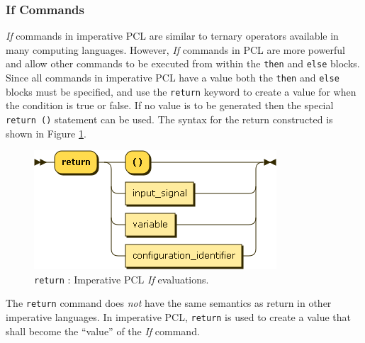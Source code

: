 \subsubsection{If Commands}
\emph{If} commands in imperative PCL are similar to ternary operators available in many computing languages. However, \emph{If} commands in PCL are more powerful and allow other commands to be executed from within the \texttt{then} and \texttt{else} blocks. Since all commands in imperative PCL have a value both the \texttt{then} and \texttt{else} blocks must be specified, and use the \texttt{return} keyword to create a value for when the condition is true or false. If no value is to be generated then the special \texttt{return ()} statement can be used. The syntax for the return constructed is shown in Figure \ref{fig:imperative-pcl-if-return}.
\begin{figure}[h!]
  \centering
    \includegraphics[scale=\DiagramScale]{chapters/adapter/diagrams/return}
  \caption{\texttt{return} : Imperative PCL \emph{If} evaluations.}
  \label{fig:imperative-pcl-if-return}
\end{figure}

The \texttt{return} command does \emph{not} have the same semantics as return in other imperative languages. In imperative PCL, \texttt{return} is used to create a value that shall become the ``value'' of the \emph{If} command.

